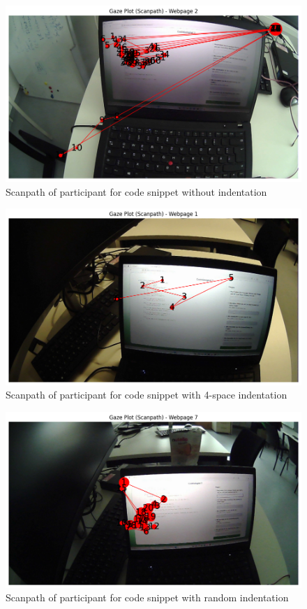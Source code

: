 \begin{figure} [H]
  \centering
  \includegraphics[scale=0.6]{figures/0-ind-rechner.png}
  \caption{Scanpath of participant for code snippet without indentation }
  \label{fig:AnhangsChor}
\end{figure}

\begin{figure} [H]
  \centering
  \includegraphics[scale=0.6]{figures/4-ind.png}
  \caption{Scanpath of participant for code snippet with 4-space indentation}
  \label{fig:AnhangsChor}
\end{figure}


\begin{figure} [H]
  \centering
  \includegraphics[scale=0.6]{figures/r-ind.png}
  \caption{Scanpath of  participant for code snippet with random indentation}
  \label{fig:AnhangsChor}
\end{figure}



